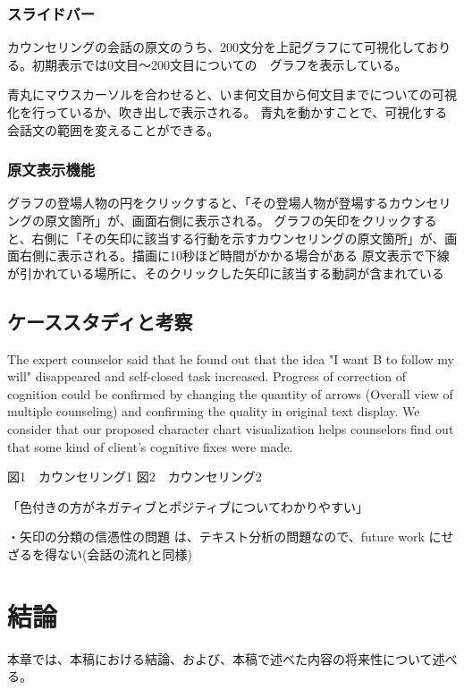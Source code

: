 \documentclass[shuuron]{kuee}
\begin{document}
\subsection{スライドバー}

カウンセリングの会話の原文のうち、200文分を上記グラフにて可視化しておりる。初期表示では0文目〜200文目についての　グラフを表示している。

青丸にマウスカーソルを合わせると、いま何文目から何文目までについての可視化を行っているか、吹き出しで表示される。
青丸を動かすことで、可視化する会話文の範囲を変えることができる。


\subsection{原文表示機能}

グラフの登場人物の円をクリックすると、「その登場人物が登場するカウンセリングの原文箇所」が、画面右側に表示される。
グラフの矢印をクリックすると、右側に「その矢印に該当する行動を示すカウンセリングの原文箇所」が、画面右側に表示される。描画に10秒ほど時間がかかる場合がある
原文表示で下線が引かれている場所に、そのクリックした矢印に該当する動詞が含まれている




\section{ケーススタディと考察}

  The expert counselor said that he found out that the idea "I want B to follow my will" disappeared and self-closed task increased. Progress of correction of cognition could be confirmed by changing the quantity of arrows (Overall view of multiple counseling) and confirming the quality in original text display. We consider that our proposed character chart visualization helps counselors find out that some kind of client's cognitive fixes were made.

  図1　カウンセリング1
  図2　カウンセリング2

  「色付きの方がネガティブとポジティブについてわかりやすい」

・矢印の分類の信憑性の問題
は、テキスト分析の問題なので、future work にせざるを得ない(会話の流れと同様)

\chapter{結論}

本章では、本稿における結論、および、本稿で述べた内容の将来性について述べる。
\end{document}
